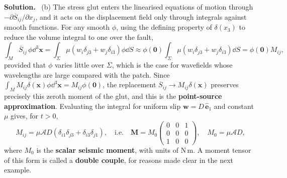 \documentclass[a4paper,12pt]{paper}
\newcounter{example}
\newenvironment{solution}{\par\noindent\textbf{Solution.}\ }{\par\medskip}
\begin{document}
\begin{solution}
(b) The stress glut enters the linearised equations of motion through
$-\partial\overline{S}_{ij}/\partial x_{j}$, and it acts on the displacement field only
through integrals against smooth functions. For any smooth $\phi$, using the defining
property of $\delta(x_{3})$ to reduce the volume integral to one over the fault,
\begin{equation}
\int_{M}\overline{S}_{ij}\,\phi\dd^{3}\mathbf{x}
=\int_{\Sigma}\mu\left(w_{i}\delta_{j3}+w_{j}\delta_{i3}\right)\phi\dd S
\approx\phi(\mathbf{0})\int_{\Sigma}\mu\left(w_{i}\delta_{j3}+w_{j}\delta_{i3}\right)\dd S
=\phi(\mathbf{0})M_{ij},
\label{eq:5}
\end{equation}
provided that $\phi$ varies little over $\Sigma$, which is the case for wavefields whose
wavelengths are large compared with the patch. Since
$\int_{M}M_{ij}\delta(\mathbf{x})\phi\dd^{3}\mathbf{x}=M_{ij}\phi(\mathbf{0})$, the
replacement $\overline{S}_{ij}\to M_{ij}\delta(\mathbf{x})$ preserves precisely this
zeroth moment of the glut, and this is the \textbf{point-source approximation}. Evaluating
the integral for uniform slip $\mathbf{w}=D\,\hat{\mathbf{e}}_{1}$ and constant $\mu$ gives,
for $t>0$,
\begin{equation}
M_{ij}=\mu\mathcal{A}D\left(\delta_{i1}\delta_{j3}+\delta_{i3}\delta_{j1}\right),
\quad\text{i.e.}\quad
\mathbf{M}=M_{0}\begin{pmatrix}0&0&1\\0&0&0\\1&0&0\end{pmatrix},\quad M_{0}=\mu\mathcal{A}D,
\label{eq:6}
\end{equation}
where $M_{0}$ is the \textbf{scalar seismic moment}, with units of $\mathrm{N\,m}$. A
moment tensor of this form is called a \textbf{double couple}, for reasons made clear in
the next example.


\end{solution}
\end{document}
